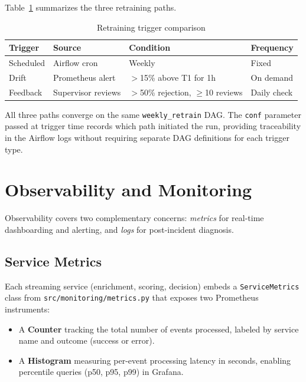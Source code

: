 Table~\ref{tab:retrain-triggers} summarizes the three retraining paths.

\begin{table}[H]
\centering
\caption{Retraining trigger comparison}
\label{tab:retrain-triggers}
\begin{tabular}{@{}llll@{}}
\toprule
\textbf{Trigger} & \textbf{Source} & \textbf{Condition} & \textbf{Frequency} \\
\midrule
Scheduled    & Airflow cron        & Weekly              & Fixed \\
Drift        & Prometheus alert    & $>$15\% above T1 for 1h & On demand \\
Feedback     & Supervisor reviews  & $>$50\% rejection, $\geq$10 reviews & Daily check \\
\bottomrule
\end{tabular}
\end{table}

All three paths converge on the same \texttt{weekly\_retrain} DAG. The
\texttt{conf} parameter passed at trigger time records which path initiated
the run, providing traceability in the Airflow logs without requiring
separate DAG definitions for each trigger type.


\section{Observability and Monitoring}
\label{sec:observability}

Observability covers two complementary concerns: \textit{metrics} for
real-time dashboarding and alerting, and \textit{logs} for post-incident
diagnosis.

\subsection{Service Metrics}

Each streaming service (enrichment, scoring, decision) embeds a
\texttt{ServiceMetrics} class from \texttt{src/monitoring/metrics.py} that
exposes two Prometheus instruments:

\begin{itemize}
    \item A \textbf{Counter} tracking the total number of events processed,
          labeled by service name and outcome (success or error).
    \item A \textbf{Histogram} measuring per-event processing latency in
          seconds, enabling percentile queries (p50, p95, p99) in Grafana.
\end{itemize}

